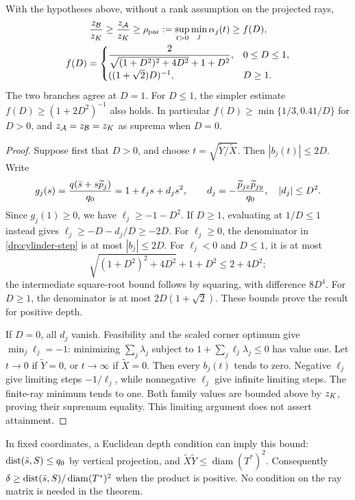 \begin{theorem}\label{dp:depth-bound}
With the hypotheses above, without a rank assumption on the projected rays,
\begin{equation}\label{dp:depth-guarantee}
 \begin{gathered}
 \frac{z_{\mathcal B}}{z_K}\ge\frac{z_{\mathcal A}}{z_K}\ge
 \rho_{\mathrm{par}}:=\sup_{t>0}\min_j\alpha_j(t)\ge f(D),\\
 f(D)=\begin{cases}
 \displaystyle\frac{2}{\sqrt{(1+D^2)^2+4D^2}+1+D^2},&0\le D\le1,\\
 ((1+\sqrt2)D)^{-1},&D\ge1.
 \end{cases}
 \end{gathered}
\end{equation}
The two branches agree at $D=1$. For $D\le1$, the simpler estimate
$f(D)\ge(1+2D^2)^{-1}$ also holds. In particular
$f(D)\ge\min\{1/3,0.41/D\}$ for $D>0$, and
$z_{\mathcal A}=z_{\mathcal B}=z_K$ as suprema when $D=0$.
\end{theorem}

\begin{proof}
Suppose first that $D>0$, and choose $t=\sqrt{\widetilde Y/\widetilde X}$.
Then $|b_j(t)|\le2D$. Write
\[
 g_j(s)=\frac{q(\bar s+s\widetilde p_j)}{q_0}
 =1+\ell_js+d_js^2,\qquad
 d_j=-\frac{\widetilde p_{jx}\widetilde p_{jy}}{q_0},\quad |d_j|\le D^2.
\]
Since $g_j(1)\ge0$, we have $\ell_j\ge-1-D^2$. If $D\ge1$, evaluating
at $1/D\le1$ instead gives $\ell_j\ge-D-d_j/D\ge-2D$.
For $\ell_j\ge0$, the denominator in \cref{dp:cylinder-step} is at most
$|b_j|\le2D$. For $\ell_j<0$ and $D\le1$, it is at most
\[
 \sqrt{(1+D^2)^2+4D^2}+1+D^2\le2+4D^2;
\]
the intermediate square-root bound follows by squaring, with difference
$8D^4$. For $D\ge1$, the denominator is at most $2D(1+\sqrt2)$.
These bounds prove the result for positive depth.

If $D=0$, all $d_j$ vanish. Feasibility and the scaled corner optimum give
$\min_j \ell_j=-1$: minimizing $\sum_j\lambda_j$ subject to
$1+\sum_j \ell_j\lambda_j\le0$ has value one. Let $t\to0$ if
$\widetilde Y=0$, or $t\to\infty$ if $\widetilde X=0$. Then every $b_j(t)$
tends to zero. Negative $\ell_j$ give limiting steps $-1/\ell_j$, while
nonnegative $\ell_j$ give infinite limiting steps. The finite-ray minimum tends
to one. Both family values are bounded above by $z_K$, proving their
supremum equality. This limiting argument does not assert attainment.
\end{proof}

In fixed coordinates, a Euclidean depth condition can imply this bound:
$\operatorname{dist}(\bar s,S)\le q_0$ by vertical projection, and
$\widetilde X\widetilde Y\le\operatorname{diam}(T^*)^2$. Consequently
$\delta\ge\operatorname{dist}(\bar s,S)/\operatorname{diam}(T^*)^2$ when the product is
positive. No condition on the ray matrix is needed in the theorem.


